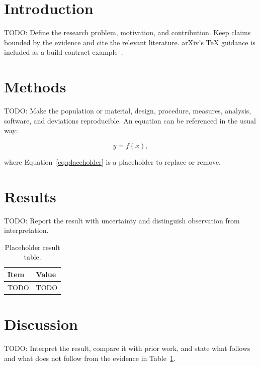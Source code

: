 \section{Introduction}

TODO: Define the research problem, motivation, and contribution. Keep claims
bounded by the evidence and cite the relevant literature. arXiv's TeX guidance
is included as a build-contract example~\citep{arxiv-submit-tex}.


\section{Methods}

TODO: Make the population or material, design, procedure, measures, analysis,
software, and deviations reproducible. An equation can be referenced in the
usual way:

\begin{equation}
  y = f(x),
  \label{eq:placeholder}
\end{equation}

where Equation~\eqref{eq:placeholder} is a placeholder to replace or remove.

\section{Results}

TODO: Report the result with uncertainty and distinguish observation from
interpretation.

\begin{table}[htbp]
  \centering
  \caption{Placeholder result table.}
  \label{tab:placeholder}
  \begin{tabular}{@{}ll@{}}
    \toprule
    Item & Value \\
    \midrule
    TODO & TODO \\
    \bottomrule
  \end{tabular}
\end{table}

\section{Discussion}

TODO: Interpret the result, compare it with prior work, and state what follows
and what does not follow from the evidence in Table~\ref{tab:placeholder}.

